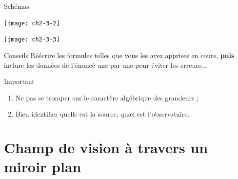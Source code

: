 \documentclass[../main/main.tex]{subfiles}
\begin{document}
\begin{NCexem}[sidebyside]{Schémas}
    \begin{center}
        \texttt{[image: ch2-3-2]}
    \end{center} 
    \tcblower
    \begin{center}
        \texttt{[image: ch2-3-3]}
    \end{center} 
\end{NCexem}

\begin{tcbraster}[raster columns=5, raster equal height=rows]
    \begin{NCcoro}[raster multicolumn=2]{Conseils}
        Réécrire les formules telles que vous les avez apprises en cours,
        \textbf{puis} inclure les données de l'énoncé une par une pour éviter les
        erreurs...
    \end{NCcoro}    
    \begin{NCimpo}[raster multicolumn=3]{Important}
        \begin{enumerate}
            \item Ne pas se tromper sur le caractère {\huge algébrique} des
                grandeurs ;
            \item Bien identifier quelle est la source, quæl est l'observataire.
        \end{enumerate}
    \end{NCimpo}
\end{tcbraster}

\section{Champ de vision à travers un miroir plan}
\end{document}
